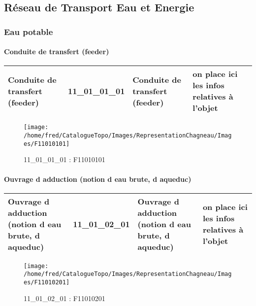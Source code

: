 \documentclass[12pt,titlepage,oneside]{book}
\begin{document}
\subsection{Réseau de Transport Eau et Energie}
\subsubsection{\large Eau potable}
\paragraph{Conduite de transfert (feeder)}
\noindent
\vspace{\baselineskip}

\renewcommand{\arraystretch}{1.2}
\begin{supertabular}{|p{10cm}|c|p{13cm}|p{12cm}|}
 Conduite de transfert (feeder) & 11\_01\_01\_01 & Conduite de transfert (feeder) & on place ici les infos relatives à l'objet\\
\hline
\end{supertabular}
\begin{figure}[h!]
  \hfill         %
  \begin{minipage}[t]{3cm}
    \begin{center}
      \texttt{[image: /home/fred/CatalogueTopo/Images/RepresentationChagneau/Images/F11010101]}
      \caption[F11010101]{\label{} 11\_01\_01\_01 : F11010101}
    \end{center}
  \end{minipage}
\end{figure}


\paragraph{Ouvrage d adduction (notion d eau brute, d aqueduc)}
\noindent
\vspace{\baselineskip}

\renewcommand{\arraystretch}{1.2}
\begin{supertabular}{|p{10cm}|c|p{13cm}|p{12cm}|}
 Ouvrage d adduction (notion d eau brute, d aqueduc) & 11\_01\_02\_01 & Ouvrage d adduction (notion d eau brute, d aqueduc) & on place ici les infos relatives à l'objet\\
\hline
\end{supertabular}
\begin{figure}[h!]
  \hfill         %
  \begin{minipage}[t]{3cm}
    \begin{center}
      \texttt{[image: /home/fred/CatalogueTopo/Images/RepresentationChagneau/Images/F11010201]}
      \caption[F11010201]{\label{} 11\_01\_02\_01 : F11010201}
    \end{center}
  \end{minipage}
\end{figure}
\end{document}
